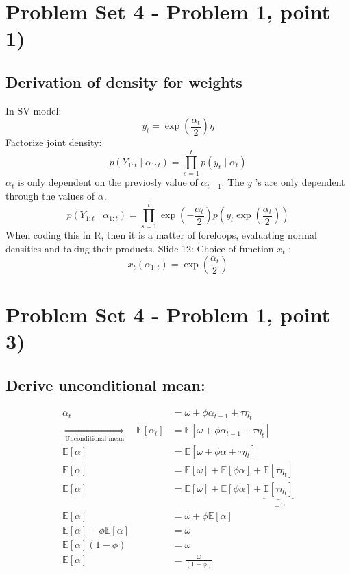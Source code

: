 \documentclass{article}
\begin{document}
\section{Problem Set 4 - Problem 1, point 1)}

\subsection{Derivation of density for weights}
In SV model:
$$
y_{t}=\exp \left(\frac{\alpha_{t}}{2}\right) \eta
$$
Factorize joint density:
$$
p\left(Y_{1: t} \mid \alpha_{1: t}\right)=\prod_{s=1}^{t} p\left(y_{t} \mid \alpha_{t}\right)
$$
$\alpha_{t}$ is only dependent on the previosly value of $\alpha_{t-1}$.
The $y$ 's are only dependent through the values of $\alpha$.
$$
p\left(Y_{1: t} \mid \alpha_{1: t}\right)=\prod_{s=1}^{t} \exp \left(-\frac{\alpha_{t}}{2}\right) p\left(y_{t} \exp \left(\frac{\alpha_{t}}{2}\right)\right)
$$
When coding this in $\mathrm{R}$, then it is a matter of foreloops, evaluating normal densities and taking their products. Slide 12:
Choice of function $x_{t}$ :
$$
x_{t}\left(\alpha_{1: t}\right)=\exp \left(\frac{\alpha_{t}}{2}\right)
$$


\section{Problem Set 4 - Problem 1, point 3)}

\subsection{Derive unconditional mean:}

\begin{align*}
\alpha_{t} & =\omega+\phi\alpha_{t-1}+\tau\eta_{t}\\
\underset{\text{Unconditional mean}}{\Longrightarrow}\quad\mathbb{E}\left[\alpha_{t}\right] & =\mathbb{E}\left[\omega+\phi\alpha_{t-1}+\tau\eta_{t}\right]\\
\mathbb{E}\left[\alpha\right] & =\mathbb{E}\left[\omega+\phi\alpha+\tau\eta_{t}\right]\\
\mathbb{E}\left[\alpha\right] & =\mathbb{E}\left[\omega\right]+\mathbb{E}\left[\phi\alpha\right]+\mathbb{E}\left[\tau\eta_{t}\right]\\
\mathbb{E}\left[\alpha\right] & =\mathbb{E}\left[\omega\right]+\mathbb{E}\left[\phi\alpha\right]+\underbrace{\mathbb{E}\left[\tau\eta_{t}\right]}_{=0}\\
\mathbb{E}\left[\alpha\right] & =\omega+\phi\mathbb{E}\left[\alpha\right]\\
\mathbb{E}\left[\alpha\right]-\phi\mathbb{E}\left[\alpha\right] & =\omega\\
\mathbb{E}\left[\alpha\right]\left(1-\phi\right) & =\omega\\
\mathbb{E}\left[\alpha\right] & =\frac{\omega}{\left(1-\phi\right)}
\end{align*}
\end{document}
